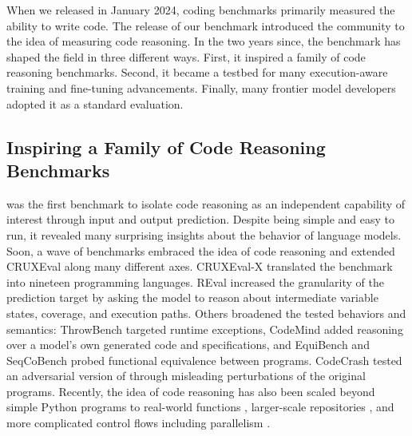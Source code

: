 When we released \benchmark{} in January 2024, coding benchmarks primarily measured the
ability to write code. The release of our benchmark introduced
the community to the idea of measuring code reasoning. In the two years since,
the benchmark has shaped the field in three different ways. First, it inspired a family of
code reasoning benchmarks. Second, it became a testbed for many execution-aware training and
fine-tuning advancements. Finally, many frontier model developers adopted it as a standard
evaluation.

\subsection{Inspiring a Family of Code Reasoning Benchmarks}
\benchmark{} was the first benchmark to isolate code reasoning as an independent
capability of interest through input and output prediction. Despite being simple and
easy to run, it revealed many surprising insights about the behavior of language models.
Soon, a wave of benchmarks embraced the idea of code reasoning and extended CRUXEval along
many different axes. CRUXEval-X \citep{xu2024cruxevalx} translated the benchmark into
nineteen programming languages. REval \citep{chen2024reval} increased the granularity of the
prediction target by asking the model to reason about intermediate variable states, coverage, and
execution paths. Others broadened the tested behaviors and semantics:
ThrowBench \citep{prenner2025throwbench} targeted runtime exceptions, CodeMind
\citep{liu2024codemind} added reasoning over a model's own generated code and
specifications, and EquiBench \citep{wei2025equibench} and SeqCoBench
\citep{maveli2025seqcobench} probed functional equivalence between programs.
CodeCrash \citep{lam2025codecrash} tested an adversarial version of \benchmark{} through misleading
perturbations of the original programs. Recently, the idea of code reasoning has also been scaled
beyond simple Python programs to real-world functions \citep{liu2025re2bench}, larger-scale
repositories \citep{li2026reporeason}, and more complicated control flows including parallelism \citep{beger2025coconut}.

